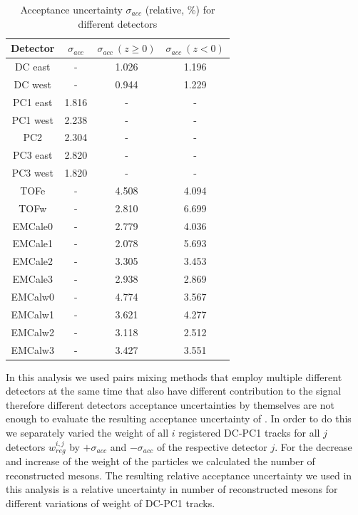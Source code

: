 \begin{table}[h!]
	\centering
	\begin{tabular}{c||c|c|c}
      Detector & $\sigma_{acc}$ & $\sigma_{acc} \ (z \geq 0)$ & $\sigma_{acc} \ (z < 0)$ \\
		\hline
		\hline
      DC east & - & 1.026 & 1.196 \\
      DC west & - & 0.944 & 1.229 \\
      PC1 east & 1.816 & - & - \\
      PC1 west & 2.238 & - & - \\
		PC2 & 2.304 & - & - \\
		PC3 east & 2.820 & - & - \\
		PC3 west & 1.820 & - & - \\
		TOFe & - & 4.508 & 4.094 \\
		TOFw & - & 2.810 & 6.699 \\
		EMCale0 & - & 2.779 & 4.036 \\
		EMCale1 & - & 2.078 & 5.693 \\
		EMCale2 & - & 3.305 & 3.453 \\
		EMCale3 & - & 2.938 & 2.869 \\
		EMCalw0 & - & 4.774 & 3.567 \\
		EMCalw1 & - & 3.621 & 4.277 \\
		EMCalw2 & - & 3.118 & 2.512 \\
		EMCalw3 & - & 3.427 & 3.551 \\
	\end{tabular}
   \caption{Acceptance uncertainty $\sigma_{acc}$ (relative, \%) for different detectors}
	\label{table:acc_unc}
\end{table}

In this analysis we used pairs mixing methods that employ multiple different detectors at the same time that also have different contribution to the signal therefore different detectors acceptance uncertainties by themselves are not enough to evaluate the resulting acceptance uncertainty of \Kstar. In order to do this we separately varied the weight of all $i$ registered DC-PC1 tracks for all $j$ detectors $w_{reg}^{i,j}$ by $+\sigma_{acc}$ and $-\sigma_{acc}$ of the respective detector $j$. For the decrease and increase of the weight of the particles we calculated the number of reconstructed \Kstar mesons. The resulting relative acceptance uncertainty we used in this analysis is a relative uncertainty in number of reconstructed \Kstar mesons for different variations of weight of DC-PC1 tracks.

